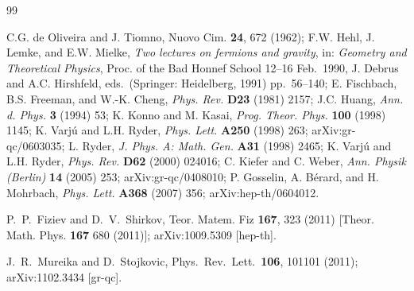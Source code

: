 \documentclass[preprint,showpacs,preprintnumbers,eqsecnum,amsmath,amssymb]{revtex4}
\begin{document}
\begin{thebibliography}{99}

C.G. de Oliveira and J. Tiomno,
Nuovo Cim. {\bf 24}, 672 (1962); %
F.W. Hehl, J. Lemke, and E.W. Mielke, {\it Two lectures on
fermions and gravity}, in: {\sl Geometry and Theoretical Physics},
Proc. of the Bad Honnef School 12--16 Feb.\ 1990, J. Debrus and
A.C. Hirshfeld, eds.\ (Springer: Heidelberg, 1991) pp.\ 56--140;
E. Fischbach, B.S. Freeman, and W.-K. Cheng,
{\sl Phys. Rev.} {\bf D23} (1981) 2157; %
J.C. Huang, %
{\sl Ann. d. Phys.} {\bf 3} (1994) 53; %
K. Konno and M. Kasai,
{\sl Prog. Theor. Phys.} {\bf 100} (1998) 1145; %
K. Varj\'u and L.H. Ryder, %
{\sl Phys. Lett.} {\bf A250} (1998) 263; %
arXiv:gr-qc/0603035;
L. Ryder, %
{\sl J. Phys. A: Math. Gen.} {\bf A31} (1998) 2465; %
K. Varj\'u and L.H. Ryder, %
{\sl Phys. Rev.} {\bf D62} (2000) 024016; %
C. Kiefer and C. Weber,
{\sl Ann. Physik (Berlin)} {\bf 14} (2005) 253; %
arXiv:gr-qc/0408010;
P. Gosselin, A. B\'erard, and H. Mohrbach, %
{\sl Phys. Lett.} {\bf A368} (2007) 356;
arXiv:hep-th/0604012.

  P.~P.~Fiziev and D.~V.~Shirkov,
  Teor. Matem. Fiz {\bf 167}, 323 %
  (2011) %
  [Theor. Math. Phys. {\bf 167} 680 %
  (2011)]; %
  arXiv:1009.5309 [hep-th].

  J.~R.~Mureika and D.~Stojkovic,
  Phys.\ Rev.\ Lett.\ {\bf 106}, 101101 (2011);
  arXiv:1102.3434 [gr-qc].


\end{thebibliography}
\end{document}
